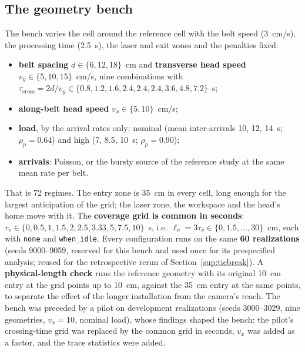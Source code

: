 \documentclass[11pt,a4paper]{article}
\newcommand{\tcross}{\tau_{\mathrm{cross}}}
\newcommand{\tv}{\tau_{v}}
\newcommand{\lv}{\ell_{v}}
\begin{document}
\subsection{The geometry bench}\label{sup:bench}
The bench varies the cell around the reference cell with the belt speed (3~cm/s), the
processing time (2.5~s), the laser and exit zones and the penalties fixed:
\begin{itemize}[nosep]
\item \textbf{belt spacing} $d\in\{6,12,18\}$~cm and \textbf{transverse head speed}
  $v_y\in\{5,10,15\}$~cm/s, nine combinations with
  $\tcross=2d/v_y\in\{0.8,1.2,1.6,2.4,2.4,2.4,3.6,4.8,7.2\}$~s;
\item \textbf{along-belt head speed} $v_x\in\{5,10\}$~cm/s;
\item \textbf{load}, by the arrival rates only: nominal (mean inter-arrivals 10, 12, 14~s;
  $\rho_p=0.64$) and high (7, 8.5, 10~s; $\rho_p=0.90$);
\item \textbf{arrivals}: Poisson, or the bursty source of the reference study at the same
  mean rate per belt.
\end{itemize}
That is 72 regimes. The entry zone is 35~cm in every cell, long enough for the largest
anticipation of the grid; the laser zone, the workspace and the head's home move with it.
The \textbf{coverage grid is common in seconds}: $\tv\in\{0,0.5,1,1.5,2,2.5,3.33,5,7.5,
10\}$~s, i.e.\ $\lv=3\tv\in\{0,1.5,\dots,30\}$~cm, each with \texttt{none} and
\texttt{when\_idle}. Every configuration runs on the same \textbf{60 realizations}
(seeds 9000--9059, reserved for this bench and used once for its prespecified analysis;
reused for the retrospective rerun of Section~\ref{sup:tiebreak}). A \textbf{physical-length
check} runs the reference geometry with its original 10~cm entry at the grid points up to
10~cm, against the 35~cm entry at the same points, to separate the effect of the longer
installation from the camera's reach. The bench was preceded by a pilot on development
realizations (seeds 3000--3029, nine geometries, $v_x=10$, nominal load), whose findings
shaped the bench: the pilot's crossing-time grid was replaced by the common grid in
seconds, $v_x$ was added as a factor, and the trace statistics were added.
\end{document}
